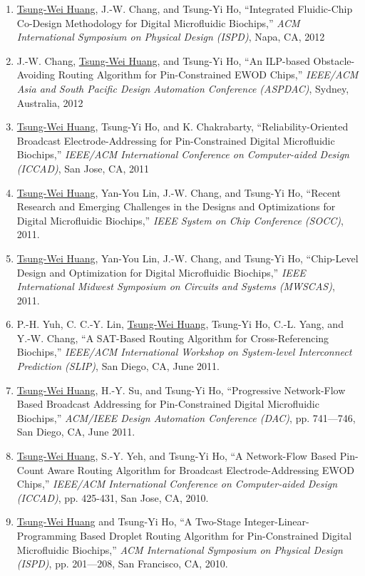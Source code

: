 \documentclass[A4,11pt]{article}
\begin{document}
\begin{enumerate}
    \item \underline{Tsung-Wei Huang}, J.-W. Chang, and Tsung-Yi Ho, ``Integrated Fluidic-Chip Co-Design Methodology for Digital Microfluidic Biochips,'' \textit{ACM International Symposium on Physical Design (ISPD)}, Napa, CA, 2012
    \item J.-W. Chang, \underline{Tsung-Wei Huang}, and Tsung-Yi Ho, ``An ILP-based Obstacle-Avoiding Routing Algorithm for Pin-Constrained EWOD Chips,'' \textit{IEEE/ACM Asia and South Pacific Design Automation Conference (ASPDAC)}, Sydney, Australia, 2012
    \item \underline{Tsung-Wei Huang}, Tsung-Yi Ho, and K. Chakrabarty, ``Reliability-Oriented Broadcast Electrode-Addressing for Pin-Constrained Digital Microfluidic Biochips,'' \textit{IEEE/ACM International Conference on Computer-aided Design (ICCAD)}, San Jose, CA, 2011
    \item \underline{Tsung-Wei Huang}, Yan-You Lin, J.-W. Chang, and Tsung-Yi Ho, ``Recent Research and Emerging Challenges in the Designs and Optimizations for Digital Microfluidic Biochips,'' \textit{IEEE System on Chip Conference (SOCC)}, 2011. 
    \item \underline{Tsung-Wei Huang}, Yan-You Lin, J.-W. Chang, and Tsung-Yi Ho, ``Chip-Level Design and Optimization for Digital Microfluidic Biochips,'' \textit{IEEE International Midwest Symposium on Circuits and Systems (MWSCAS)}, 2011. 
    \item P.-H. Yuh, C. C.-Y. Lin, \underline{Tsung-Wei Huang}, Tsung-Yi Ho, C.-L. Yang, and Y.-W. Chang, ``A SAT-Based Routing Algorithm for Cross-Referencing Biochips,'' \textit{IEEE/ACM International Workshop on System-level Interconnect Prediction (SLIP)}, San Diego, CA, June 2011.
    \item \underline{Tsung-Wei Huang}, H.-Y. Su, and Tsung-Yi Ho, ``Progressive Network-Flow Based Broadcast Addressing for Pin-Constrained Digital Microfluidic Biochips,'' \textit{ACM/IEEE Design Automation Conference (DAC)}, pp. 741—746, San Diego, CA, June 2011. 
    \item \underline{Tsung-Wei Huang}, S.-Y. Yeh, and Tsung-Yi Ho, ``A Network-Flow Based Pin-Count Aware Routing Algorithm for Broadcast Electrode-Addressing EWOD Chips,'' \textit{IEEE/ACM International Conference on Computer-aided Design (ICCAD)}, pp. 425-431, San Jose, CA, 2010. 
    \item \underline{Tsung-Wei Huang} and Tsung-Yi Ho, ``A Two-Stage Integer-Linear-Programming Based Droplet Routing Algorithm for Pin-Constrained Digital Microfluidic Biochips,'' \textit{ACM International Symposium on Physical Design (ISPD)}, pp. 201—208, San Francisco, CA, 2010. 

\end{enumerate}
\end{document}
